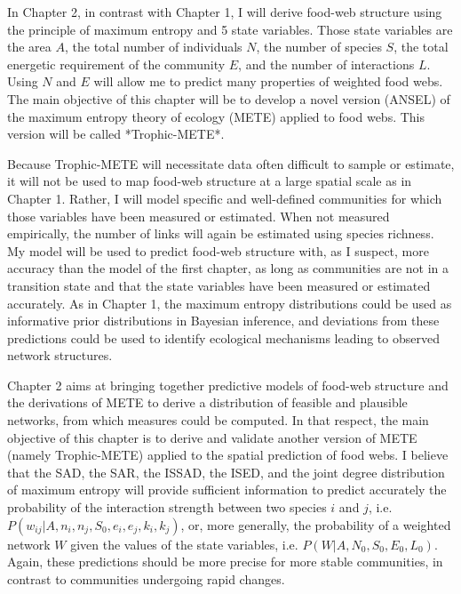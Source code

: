 In Chapter 2, in contrast with Chapter 1, I will derive food-web structure using
the principle of maximum entropy and 5 state variables. Those state variables
are the area $A$, the total number of individuals $N$, the number of species
$S$, the total energetic requirement of the community $E$, and the number of
interactions $L$. Using $N$ and $E$ will allow me to predict many properties of
weighted food webs. The main objective of this chapter will be to develop a
novel version (ANSEL) of the maximum entropy theory of ecology (METE) applied to
food webs. This version will be called *Trophic-METE*.

Because Trophic-METE will necessitate data often difficult to sample or
estimate, it will not be used to map food-web structure at a large spatial scale
as in Chapter 1. Rather, I will model specific and well-defined communities for
which those variables have been measured or estimated. When not measured
empirically, the number of links will again be estimated using species richness.
My model will be used to predict food-web structure with, as I suspect, more
accuracy than the model of the first chapter, as long as communities are not in
a transition state and that the state variables have been measured or estimated
accurately. As in Chapter 1, the maximum entropy distributions could be used as
informative prior distributions in Bayesian inference, and deviations from these
predictions could be used to identify ecological mechanisms leading to observed
network structures.

Chapter 2 aims at bringing together predictive models of food-web structure and
the derivations of METE to derive a distribution of feasible and plausible
networks, from which measures could be computed. In that respect, the main
objective of this chapter is to derive and validate another version of METE
(namely Trophic-METE) applied to the spatial prediction of food webs. I believe
that the SAD, the SAR, the ISSAD, the ISED, and the joint degree distribution of
maximum entropy will provide sufficient information to predict accurately the
probability of the interaction strength between two species $i$ and $j$, i.e.
$P(w_{ij}|A, n_i, n_j, S_0, e_i, e_j, k_i, k_j)$, or, more generally, the
probability of a weighted network $W$ given the values of the state variables,
i.e. $P(W|A, N_0, S_0, E_0, L_0)$. Again, these predictions should be more
precise for more stable communities, in contrast to communities undergoing rapid
changes.  

